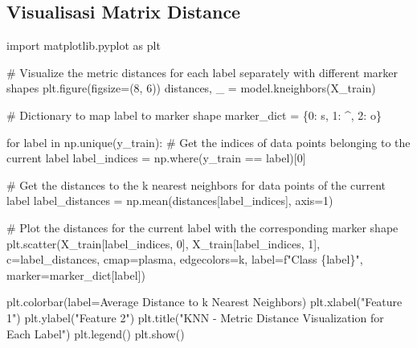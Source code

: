 \documentclass[
  letterpaper,
  DIV=11,
  numbers=noendperiod]{scrreprt}
\newenvironment{Shaded}{\begin{snugshade}}{\end{snugshade}}
\newcommand{\CommentTok}[1]{\textcolor[rgb]{0.37,0.37,0.37}{#1}}
\newcommand{\ControlFlowTok}[1]{\textcolor[rgb]{0.00,0.23,0.31}{#1}}
\newcommand{\DecValTok}[1]{\textcolor[rgb]{0.68,0.00,0.00}{#1}}
\newcommand{\ImportTok}[1]{\textcolor[rgb]{0.00,0.46,0.62}{#1}}
\newcommand{\KeywordTok}[1]{\textcolor[rgb]{0.00,0.23,0.31}{#1}}
\newcommand{\NormalTok}[1]{\textcolor[rgb]{0.00,0.23,0.31}{#1}}
\newcommand{\OperatorTok}[1]{\textcolor[rgb]{0.37,0.37,0.37}{#1}}
\newcommand{\SpecialCharTok}[1]{\textcolor[rgb]{0.37,0.37,0.37}{#1}}
\newcommand{\SpecialStringTok}[1]{\textcolor[rgb]{0.13,0.47,0.30}{#1}}
\newcommand{\StringTok}[1]{\textcolor[rgb]{0.13,0.47,0.30}{#1}}
\begin{document}
\hypertarget{visualisasi-matrix-distance}{%
\subsection*{Visualisasi Matrix
Distance}\label{visualisasi-matrix-distance}}

\begin{Shaded}
\begin{Highlighting}[]
\ImportTok{import}\NormalTok{ matplotlib.pyplot }\ImportTok{as}\NormalTok{ plt}

\CommentTok{\# Visualize the metric distances for each label separately with different marker shapes}
\NormalTok{plt.figure(figsize}\OperatorTok{=}\NormalTok{(}\DecValTok{8}\NormalTok{, }\DecValTok{6}\NormalTok{))}
\NormalTok{distances, \_ }\OperatorTok{=}\NormalTok{ model.kneighbors(X\_train)}

\CommentTok{\# Dictionary to map label to marker shape}
\NormalTok{marker\_dict }\OperatorTok{=}\NormalTok{ \{}\DecValTok{0}\NormalTok{: }\StringTok{\textquotesingle{}s\textquotesingle{}}\NormalTok{, }\DecValTok{1}\NormalTok{: }\StringTok{\textquotesingle{}\^{}\textquotesingle{}}\NormalTok{, }\DecValTok{2}\NormalTok{: }\StringTok{\textquotesingle{}o\textquotesingle{}}\NormalTok{\}}

\ControlFlowTok{for}\NormalTok{ label }\KeywordTok{in}\NormalTok{ np.unique(y\_train):}
    \CommentTok{\# Get the indices of data points belonging to the current label}
\NormalTok{    label\_indices }\OperatorTok{=}\NormalTok{ np.where(y\_train }\OperatorTok{==}\NormalTok{ label)[}\DecValTok{0}\NormalTok{]}
    
    \CommentTok{\# Get the distances to the k nearest neighbors for data points of the current label}
\NormalTok{    label\_distances }\OperatorTok{=}\NormalTok{ np.mean(distances[label\_indices], axis}\OperatorTok{=}\DecValTok{1}\NormalTok{)}
    
    \CommentTok{\# Plot the distances for the current label with the corresponding marker shape}
\NormalTok{    plt.scatter(X\_train[label\_indices, }\DecValTok{0}\NormalTok{], X\_train[label\_indices, }\DecValTok{1}\NormalTok{], c}\OperatorTok{=}\NormalTok{label\_distances, cmap}\OperatorTok{=}\StringTok{\textquotesingle{}plasma\textquotesingle{}}\NormalTok{, edgecolors}\OperatorTok{=}\StringTok{\textquotesingle{}k\textquotesingle{}}\NormalTok{, label}\OperatorTok{=}\SpecialStringTok{f"Class }\SpecialCharTok{\{}\NormalTok{label}\SpecialCharTok{\}}\SpecialStringTok{"}\NormalTok{, marker}\OperatorTok{=}\NormalTok{marker\_dict[label])}

\NormalTok{plt.colorbar(label}\OperatorTok{=}\StringTok{\textquotesingle{}Average Distance to k Nearest Neighbors\textquotesingle{}}\NormalTok{)}
\NormalTok{plt.xlabel(}\StringTok{"Feature 1"}\NormalTok{)}
\NormalTok{plt.ylabel(}\StringTok{"Feature 2"}\NormalTok{)}
\NormalTok{plt.title(}\StringTok{"KNN {-} Metric Distance Visualization for Each Label"}\NormalTok{)}
\NormalTok{plt.legend()}
\NormalTok{plt.show()}
\end{Highlighting}
\end{Shaded}
\end{document}
